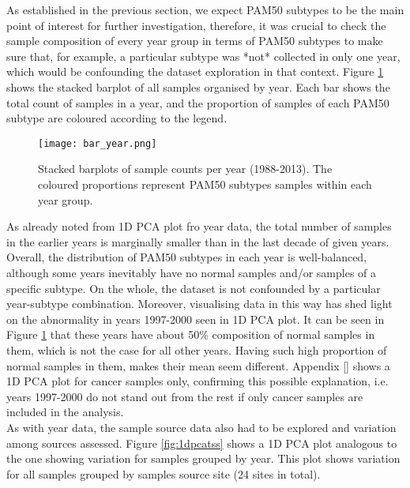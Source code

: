     As established in the previous section, we expect PAM50 subtypes to be the main point of interest for further investigation, therefore, it was crucial to check the sample composition of every year group in terms of PAM50 subtypes to make sure that, for example, a particular subtype was *not*  collected in only one year, which would be confounding the dataset exploration in that context. Figure \ref{fig:baryear} shows the stacked barplot of all samples organised by year.  Each bar shows the total count of samples in a year, and the proportion of samples of each PAM50 subtype are coloured according to the legend. 
    
    
            \begin{figure}[!h]
            \centering
            \texttt{[image: bar\_year.png]}
            \caption{Stacked barplots of sample counts per year (1988-2013). The coloured proportions represent PAM50 subtypes samples within each year group. }
            \label{fig:baryear}
            \end{figure}
    
    As already noted from 1D PCA plot fro year data, the total number of samples in the earlier years is marginally smaller than in the last decade of given years. Overall, the distribution of PAM50 subtypes in each year is well-balanced,  although some years inevitably have no normal samples and/or samples of a specific subtype. On the whole, the dataset is not confounded by a particular year-subtype combination.  Moreover, visualising data in this way has shed light on the abnormality in years 1997-2000 seen in 1D PCA plot. It can be seen in Figure \ref{fig:baryear} that these years have about 50\% composition of normal samples in them, which is not the case for all other years. Having such high proportion of normal samples in them, makes their mean seem different. Appendix \ref{} shows a 1D PCA plot for cancer samples only, confirming this possible explanation, i.e. years 1997-2000 do not stand out from the rest if only cancer samples are included in the analysis. \\
    
    \newpage
    As with year data, the sample source data also had to be explored and variation among sources assessed. Figure \ref{fig:1dpcatss} shows a 1D PCA plot analogous to the one showing variation for samples grouped by year. This plot shows variation for all samples grouped by samples source site (24 sites in total).\\  
            
